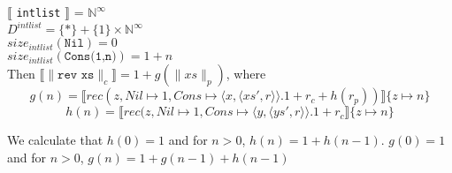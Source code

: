 $\llbracket$ \texttt{intlist} $\rrbracket$ = $\mathbb{N}^\infty$\\
$D^{intlist} = \{\ast\} + \{1\} \times \mathbb{N}^\infty$\\
$size_{intlist}(\texttt{Nil}) = 0$\\
$size_{intlist}(\texttt{Cons(1,n)}) = 1 + n$\\

Then $\llbracket \| \texttt{rev xs} \|_c \rrbracket = 1 + g(\|xs\|_p)$, where
\[g(n) = \llbracket rec(z, Nil \mapsto 1, Cons \mapsto \langle x, \langle xs',r\rangle \rangle.1 + r_c + h(r_p))\rrbracket \{z \mapsto n\}\]
\[h(n) = \llbracket rec(z, Nil \mapsto 1, Cons \mapsto \langle y, \langle ys',r\rangle \rangle.1 + r_c \rrbracket \{z \mapsto n\}\]

We calculate that $h(0)=1$ and for $n > 0$, $h(n) = 1 + h(n-1)$.
$g(0) = 1$ and for $n > 0$, $g(n) = 1 + g(n-1) + h(n-1)$
